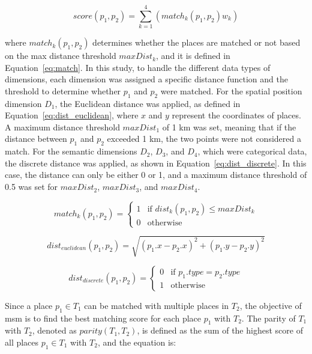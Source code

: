 \documentclass{article}
\theoremstyle{definition}
\theoremstyle{remark}
\begin{document}
\begin{equation} \label{eq:match_score}
    score(p_{1},p_{2}) = \sum_{k=1}^{4}(match_{k}(p_{1},p_{2})w_{k})
\end{equation}

where $match_{k}(p_{1},p_{2})$ determines whether the places are matched or not based on the max distance threshold $maxDist_{k}$, and it is defined in Equation~\ref{eq:match}. In this study, to handle the different data types of dimensions, each dimension was assigned a specific distance function and the threshold to determine whether $p_{1}$ and $p_{2}$ were matched. For the spatial position dimension $D_{1}$, the Euclidean distance was applied, as defined in Equation~\ref{eq:dist_euclidean}, where $x$ and $y$ represent the coordinates of places. A maximum distance threshold $maxDist_{1}$ of 1 km was set, meaning that if the distance between $p_{1}$ and $p_{2}$ exceeded 1 km, the two points were not considered a match. For the semantic dimensions $D_{2}$, $D_{3}$, and $D_{4}$, which were categorical data, the discrete distance was applied, as shown in Equation~\ref{eq:dist_discrete}. In this case, the distance can only be either 0 or 1, and a maximum distance threshold of 0.5 was set for $maxDist_{2}$, $maxDist_{3}$, and $maxDist_{4}$.

\begin{equation} \label{eq:match}
    match_{k}(p_{1},p_{2}) = \begin{cases}
    1 & \text{if } dist_{k}(p_{1},p_{2}) \leq maxDist_{k}  \\
    0 & \text{otherwise}
    \end{cases}
\end{equation}

\begin{equation} \label{eq:dist_euclidean}
    dist_{euclidean}(p_{1},p_{2}) = \sqrt{(p_{1}.x-p_{2}.x)^2+(p_{1}.y-p_{2}.y)^2}
\end{equation}

\begin{equation} \label{eq:dist_discrete}
    dist_{discrete}(p_{1},p_{2}) = \begin{cases}
    0 & \text{if } p_{1}.type = p_{2}.type  \\
    1 & \text{otherwise}
    \end{cases}
\end{equation}

Since a place $p_{1} \in T_{1}$ can be matched with multiple places in $T_{2}$, the objective of \acrshort{msm} is to find the best matching score for each place $p_{1}$ with $T_{2}$. The parity of $T_{1}$ with $T_{2}$, denoted as $parity(T_{1},T_{2})$, is defined as the sum of the highest score of all places $p_{1} \in T_{1}$ with $T_{2}$, and the equation is:
\end{document}
